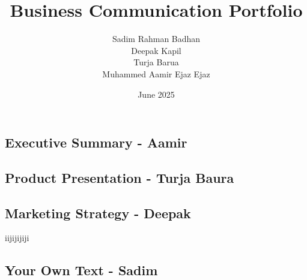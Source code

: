 \documentclass{article}
\title{\centering Business Communication Portfolio}
\author{\centering Sadim Rahman Badhan \\ Deepak Kapil \\ Turja Barua \\ Muhammed Aamir Ejaz Ejaz}
\date{\centering June 2025}
\begin{document}
\begin{center}
    \section*{Executive Summary - Aamir}
\end{center}

\begin{center}
    \section*{Product Presentation - Turja Baura}
\end{center}

\begin{center}
    \section*{Marketing Strategy - Deepak}
	iijijijiji
\end{center}

\begin{center}
    \section*{Your Own Text - Sadim}
\end{center}
\end{document}
